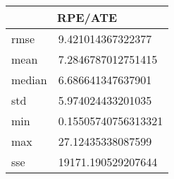 \begin{table}[!ht] 
 \centering 
 \begin{tabular}{|l|l|} \hline 
 \multicolumn{2}{|c|}{RPE/ATE} \\ \hline 
 rmse & 9.421014367322377 \\ \hline 
mean & 7.2846787012751415 \\ \hline 
median & 6.686641347637901 \\ \hline 
std & 5.974024433201035 \\ \hline 
min & 0.15505740756313321 \\ \hline 
max & 27.12435338087599 \\ \hline 
sse & 19171.190529207644 \\ \hline 
\end{tabular} 
 \end{table}